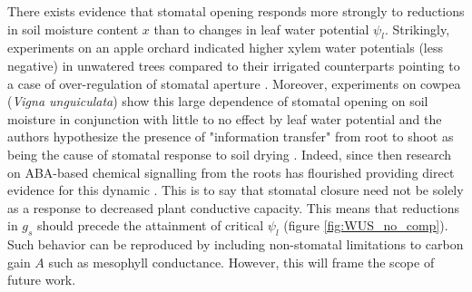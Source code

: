 \documentclass[utf8]{frontiersSCNS} %
\begin{document}
There exists evidence that stomatal opening responds more strongly to reductions in soil moisture content $x$ than to changes in leaf water potential $\psi_l$. Strikingly, experiments on an apple orchard indicated higher xylem water potentials (less negative) in unwatered trees compared to their irrigated counterparts pointing to a case of over-regulation of stomatal aperture \citep{jones1983experimental}. Moreover, experiments on cowpea (\textit{Vigna unguiculata}) show this large dependence of stomatal opening on soil moisture in conjunction with little to no effect by leaf water potential and the authors hypothesize the presence of "information transfer" from root to shoot as being the cause of stomatal response to soil drying \citep{bates1981stomatal}. Indeed, since then research on ABA-based chemical signalling from the roots has flourished providing direct evidence for this dynamic \citep{davies1991root}. This is to say that stomatal closure need not be solely as a response to decreased plant conductive capacity. This means that reductions in $g_s$ should precede the attainment of critical $\psi_l$ (figure \ref{fig:WUS_no_comp}). Such behavior can be reproduced by including non-stomatal limitations to carbon gain $A$ such as mesophyll conductance. However, this will frame the scope of future work.
\end{document}
